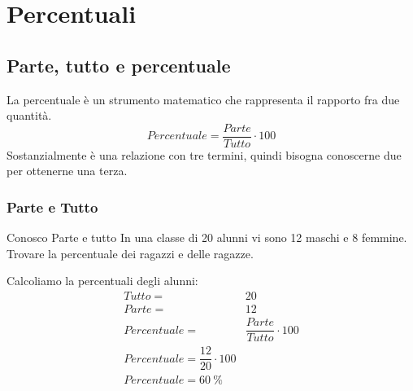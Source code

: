 \chapter{Percentuali}
\section{Parte, tutto e percentuale}
La percentuale è un strumento matematico che rappresenta il rapporto fra due quantità.
\[Percentuale=\dfrac{Parte}{Tutto}\cdot 100\]
Sostanzialmente è una relazione con tre termini, quindi bisogna conoscerne due per ottenerne una terza.
\subsection{Parte e Tutto} 
	\begin{esempiot}{Conosco Parte e tutto}{}
	In una classe di \num{20} alunni vi sono \num{12} maschi e \num{8} femmine. Trovare la percentuale dei ragazzi e delle ragazze.
\end{esempiot}
Calcoliamo la percentuali degli alunni:
\begin{align*}
Tutto=&\num{20}\\
Parte=&\num{12}\\
Percentuale=&\dfrac{Parte}{Tutto}\cdot 100\\
Percentuale=\dfrac{12}{20}\cdot 100\\
Percentuale=\SI{60}{\percent}
\end{align*}
